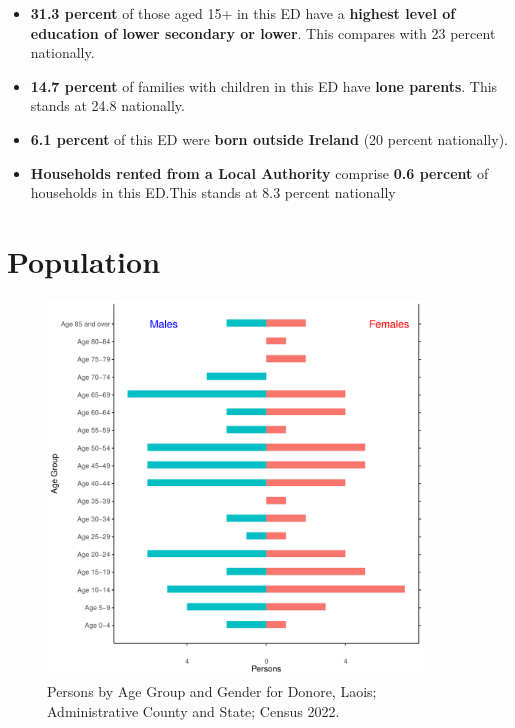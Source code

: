 \documentclass{article}
\begin{document}
\begin{itemize}
\item \textbf{31.3 percent} of those aged 15+ in this ED have a \textbf{highest level of education of lower secondary or lower}. This compares with 23 percent nationally. 

\item \textbf{14.7 percent} of families with children in this ED have \textbf{lone parents}. This stands at 24.8 nationally.

\item \textbf{6.1 percent} of this ED were \textbf{born outside Ireland} (20 percent nationally).

\item \textbf{Households rented from a Local Authority} comprise \textbf{0.6 percent} of households in this ED.This stands at 8.3 percent nationally

\end{itemize}

\pagebreak

\section{Population} 
\label{sect:Pop}

\begin{figure}[h]
	\centering
	\includegraphics[width = 100mm]{../figures/PyramidPlot.pdf}
	\caption{Persons by Age Group and Gender for Donore, Laois; Administrative County and State; Census 2022.}
	\label{fig:2ae19629-1a6a-13a3-e055-000000000001}
	\end{figure}
\end{document}
